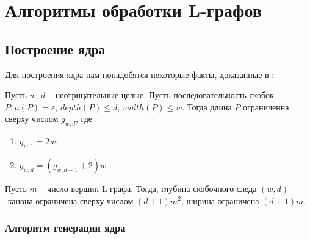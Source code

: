 \chapter{Алгоритмы обработки L-графов} \label{chapter2} 


\section{Построение ядра}
\label{core_gen_algo}

Для построения ядра нам понадобятся некоторые факты, доказанные в \cite{stan1}:

\begin{theorem}
    \label{canon_length_limit_theorem}
    Пусть $w$, $d$ -- неотрицательные целые. Пусть последовательность скобок $P : \mu(P)=\varepsilon$, $depth(P) \leq d$, $width(P) \leq w$. 
    Тогда длина $P$ ограниченна сверху числом $g_{w,d}$, где 
    \begin{enumerate}
        \item $g_{w,1} = 2w$;
        \item $g_{w,d} = (g_{w,d-1} + 2)w$ .
    \end{enumerate}
\end{theorem}
\begin{lemma}
    \label{wd_upper_limit_lemma}
    Пусть $m$ -- число вершин L-графа. Тогда, глубина скобочного следа $(w,d)$-канона ограничена сверху числом $(d+1)m^2$, ширина ограничена $(d+1)m$.
\end{lemma}

\subsection*{Алгоритм генерации ядра}

